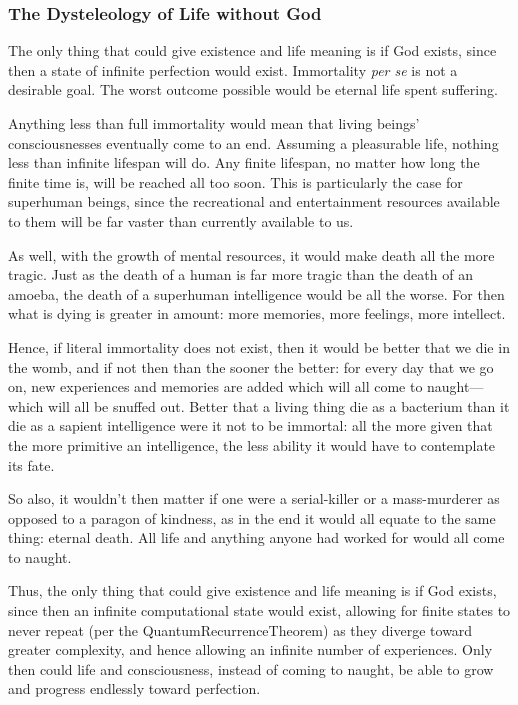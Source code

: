 \documentclass[letterpaper,12pt]{article}
\begin{document}
\subsubsection{The Dysteleology of Life without God}
\label{subsubsec:DysteleologyOfLifeWithoutGod}

The only thing that could give existence and life meaning is if God exists, since then a state of infinite perfection would exist. Immortality \emph{per se} is not a desirable goal. The worst outcome possible would be eternal life spent suffering.

Anything less than full immortality would mean that living beings' consciousnesses eventually come to an end. Assuming a pleasurable life, nothing less than infinite lifespan will do. Any finite lifespan, no matter how long the finite time is, will be reached all too soon. This is particularly the case for superhuman beings, since the recreational and entertainment resources available to them will be far vaster than currently available to us.

As well, with the growth of mental resources, it would make death all the more tragic. Just as the death of a human is far more tragic than the death of an amoeba, the death of a superhuman intelligence would be all the worse. For then what is dying is greater in amount: more memories, more feelings, more intellect.

Hence, if literal immortality does not exist, then it would be better that we die in the womb, and if not then than the sooner the better: for every day that we go on, new experiences and memories are added which will all come to naught---which will all be snuffed out. Better that a living thing die as a bacterium than it die as a sapient intelligence were it not to be immortal: all the more given that the more primitive an intelligence, the less ability it would have to contemplate its fate.

So also, it wouldn't then matter if one were a serial-killer or a mass-murderer as opposed to a paragon of kindness, as in the end it would all equate to the same thing: eternal death. All life and anything anyone had worked for would all come to naught.

Thus, the only thing that could give existence and life meaning is if God exists, since then an infinite computational state would exist, allowing for finite states to never repeat (per the \gls{QuantumRecurrenceTheorem}) as they diverge toward greater complexity, and hence allowing an infinite number of experiences. Only then could life and consciousness, instead of coming to naught, be able to grow and progress endlessly toward perfection.
\end{document}
